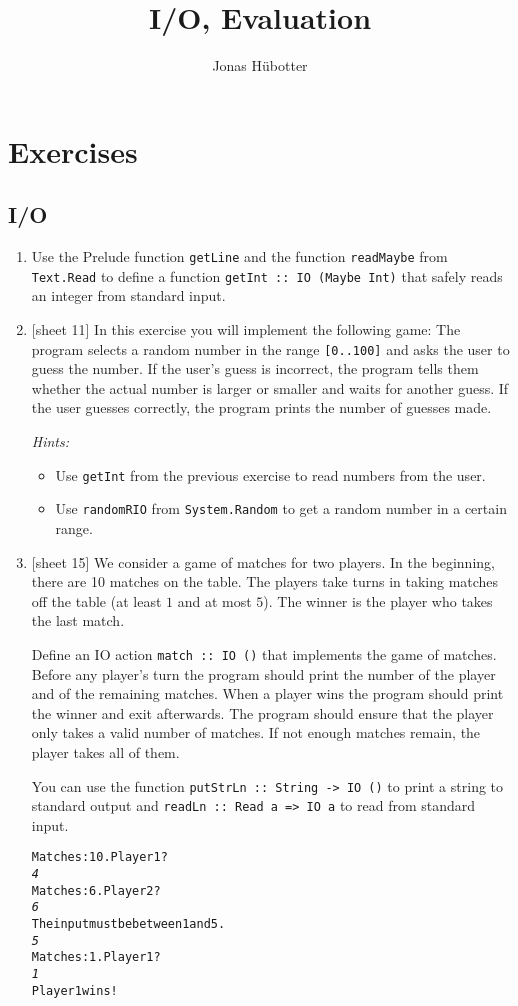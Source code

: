 \documentclass{article}
\title{I/O, Evaluation}
\author{Jonas Hübotter}
\def\code#1{\texttt{#1}}
\begin{document}
\maketitle

\section{Exercises}

\subsection{I/O}
\begin{enumerate}
    \item Use the Prelude function \code{getLine} and the function \code{readMaybe} from \code{Text.Read} to define a function \code{getInt :: IO (Maybe Int)} that safely reads an integer from standard input.

    \item {[sheet 11]} In this exercise you will implement the following game: The program selects a random number in the range \code{[0..100]} and asks the user to guess the number. If the user's guess is incorrect, the program tells them whether the actual number is larger or smaller and waits for another guess. If the user guesses correctly, the program prints the number of guesses made. \par
        \textit{Hints:}
        \begin{itemize}
            \item Use \code{getInt} from the previous exercise to read numbers from the user.
            \item Use \code{randomRIO} from \code{System.Random} to get a random number in a certain range.
        \end{itemize}

    \item {[sheet 15]} We consider a game of matches for two players. In the beginning, there are 10 matches on the table. The players take turns in taking matches off the table (at least $1$ and at most $5$). The winner is the player who takes the last match. \par
        Define an IO action \code{match :: IO ()} that implements the game of matches. Before any player's turn the program should print the number of the player and of the remaining matches. When a player wins the program should print the winner and exit afterwards. The program should ensure that the player only takes a valid number of matches. If not enough matches remain, the player takes all of them. \par
        You can use the function \code{putStrLn :: String -> IO ()} to print a string to standard output and \code{readLn :: Read a => IO a} to read from standard input.
        \begin{alltt}
    Matches: 10. Player 1?
    \textit{4}
    Matches: 6. Player 2?
    \textit{6}
    The input must be between 1 and 5.
    \textit{5}
    Matches: 1. Player 1?
    \textit{1}
    Player 1 wins!
        \end{alltt}
\end{enumerate}
\end{document}
